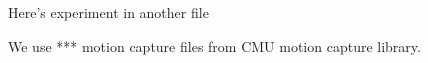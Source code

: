 Here's experiment in another file

We use *** motion capture files from CMU motion capture library.

